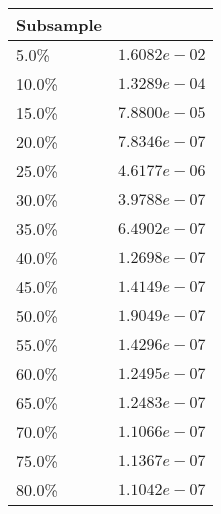 \begin{tabular}{l|l}
    Subsample & \\
    \hline
    5.0\% & $1.6082e-02$ \\
    10.0\% & $1.3289e-04$ \\
    15.0\% & $7.8800e-05$ \\
    20.0\% & $7.8346e-07$ \\
    25.0\% & $4.6177e-06$ \\
    30.0\% & $3.9788e-07$ \\
    35.0\% & $6.4902e-07$ \\
    40.0\% & $1.2698e-07$ \\
    45.0\% & $1.4149e-07$ \\
    50.0\% & $1.9049e-07$ \\
    55.0\% & $1.4296e-07$ \\
    60.0\% & $1.2495e-07$ \\
    65.0\% & $1.2483e-07$ \\
    70.0\% & $1.1066e-07$ \\
    75.0\% & $1.1367e-07$ \\
    80.0\% & $1.1042e-07$ \\
\end{tabular}